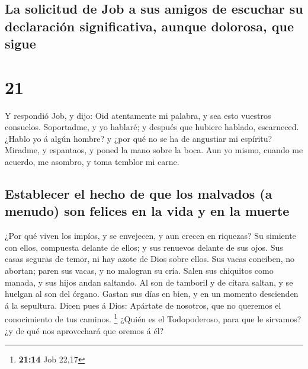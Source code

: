 \hypertarget{la-solicitud-de-job-a-sus-amigos-de-escuchar-su-declaraciuxf3n-significativa-aunque-dolorosa-que-sigue}{%
\subsection{La solicitud de Job a sus amigos de escuchar su declaración
significativa, aunque dolorosa, que
sigue}\label{la-solicitud-de-job-a-sus-amigos-de-escuchar-su-declaraciuxf3n-significativa-aunque-dolorosa-que-sigue}}

\hypertarget{section-20}{%
\section{21}\label{section-20}}

 Y respondió Job, y dijo:  Oid atentamente mi
palabra, y sea esto vuestros consuelos.  Soportadme, y yo
hablaré; y después que hubiere hablado, escarneced.  ¿Hablo
yo á algún hombre? y ¿por qué no se ha de angustiar mi espíritu?
 Miradme, y espantaos, y poned la mano sobre la boca.
 Aun yo mismo, cuando me acuerdo, me asombro, y toma temblor
mi carne.

\hypertarget{establecer-el-hecho-de-que-los-malvados-a-menudo-son-felices-en-la-vida-y-en-la-muerte}{%
\subsection{Establecer el hecho de que los malvados (a menudo) son
felices en la vida y en la
muerte}\label{establecer-el-hecho-de-que-los-malvados-a-menudo-son-felices-en-la-vida-y-en-la-muerte}}

 ¿Por qué viven los impíos, y se envejecen, y aun crecen en
riquezas?  Su simiente con ellos, compuesta delante de
ellos; y sus renuevos delante de sus ojos.  Sus casas
seguras de temor, ni hay azote de Dios sobre ellos.  Sus
vacas conciben, no abortan; paren sus vacas, y no malogran su cría.
 Salen sus chiquitos como manada, y sus hijos andan
saltando.  Al son de tamboril y de cítara saltan, y se
huelgan al son del órgano.  Gastan sus días en bien, y en
un momento descienden á la sepultura.  Dicen pues á Dios:
Apártate de nosotros, que no queremos el conocimiento de tus caminos.
\footnote{\textbf{21:14} Job 22,17}  ¿Quién es el
Todopoderoso, para que le sirvamos? ¿y de qué nos aprovechará que oremos
á él?

